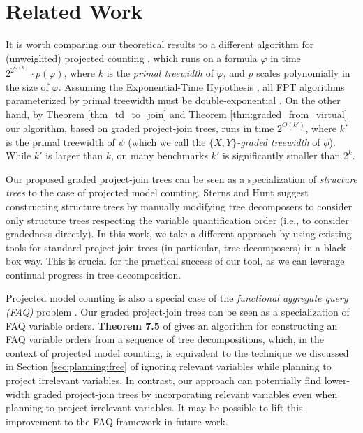 \section{Related Work}

It is worth comparing our theoretical results to a different algorithm for (unweighted) projected counting \cite{fichte2018exploiting}, which runs on a formula $\varphi$ in time $2^{2^{O(k)}} \cdot p(\varphi)$, where $k$ is the \emph{primal treewidth} \cite{SS10} of $\varphi$, and $p$ scales polynomially in the size of $\varphi$. Assuming the Exponential-Time Hypothesis \cite{impagliazzo2001problems}, all FPT algorithms parameterized by primal treewidth must be double-exponential \cite{fichte2018exploiting}. 
On the other hand, by Theorem \ref{thm_td_to_join} and Theorem \ref{thm:graded_from_virtual} our algorithm, based on graded project-join trees, runs in time $2^{O(k')}$, where $k'$ is the primal treewidth of $\psi$ (which we call the \emph{$\{X,Y\}$-graded treewidth} of $\phi$). While $k'$ is larger than $k$, on many benchmarks $k'$ is significantly smaller than $2^k$. 

Our proposed graded project-join trees can be seen as a specialization of \emph{structure trees} \cite{stearns2002exploiting} to the case of projected model counting. Sterns and Hunt \cite{stearns2002exploiting} suggest constructing structure trees by manually modifying tree decomposers to consider only structure trees respecting the variable quantification order (i.e., to consider gradedness directly). In this work, we take a different approach by using existing tools for standard project-join trees (in particular, tree decomposers) in a black-box way. This is crucial for the practical success of our tool, as we can leverage continual progress in tree decomposition. 

Projected model counting is also a special case of the \emph{functional aggregate query (FAQ)} problem \cite{KNR16}. 	Our graded project-join trees can be seen as a specialization of FAQ variable orders. \textbf{Theorem 7.5} of \cite{KNR16} gives an algorithm for constructing an FAQ variable orders from a sequence of tree decompositions, which, in the context of projected model counting, is equivalent to the technique we discussed in Section \ref{sec:planning:free} of ignoring relevant variables while planning to project irrelevant variables. In contrast, our approach can potentially find lower-width graded project-join trees by incorporating relevant variables even when planning to project irrelevant variables. It may be possible to lift this improvement to the FAQ framework in future work.

